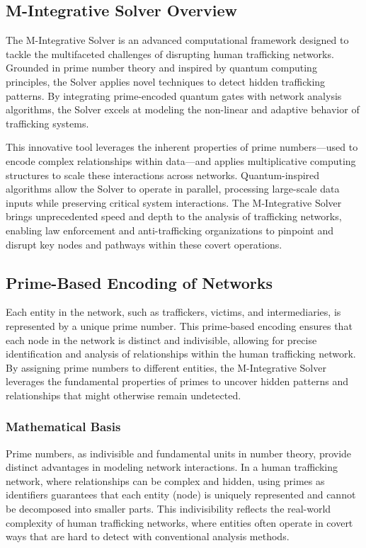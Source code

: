 \documentclass[%
 preprint, linenumbers,
 amsmath,amssymb,
 aps, physrev,
]{revtex4-2}
\begin{document}
\subsection{M-Integrative Solver Overview} The M-Integrative Solver is an advanced computational framework designed to tackle the multifaceted challenges of disrupting human trafficking networks. Grounded in prime number theory and inspired by quantum computing principles, the Solver applies novel techniques to detect hidden trafficking patterns. By integrating prime-encoded quantum gates with network analysis algorithms, the Solver excels at modeling the non-linear and adaptive behavior of trafficking systems.

This innovative tool leverages the inherent properties of prime numbers—used to encode complex relationships within data—and applies multiplicative computing structures to scale these interactions across networks. Quantum-inspired algorithms allow the Solver to operate in parallel, processing large-scale data inputs while preserving critical system interactions. The M-Integrative Solver brings unprecedented speed and depth to the analysis of trafficking networks, enabling law enforcement and anti-trafficking organizations to pinpoint and disrupt key nodes and pathways within these covert operations.

\subsection{Prime-Based Encoding of Networks}

Each entity in the network, such as traffickers, victims, and intermediaries, is represented by a unique prime number. This prime-based encoding ensures that each node in the network is distinct and indivisible, allowing for precise identification and analysis of relationships within the human trafficking network. By assigning prime numbers to different entities, the M-Integrative Solver leverages the fundamental properties of primes to uncover hidden patterns and relationships that might otherwise remain undetected.

\subsubsection{Mathematical Basis}

Prime numbers, as indivisible and fundamental units in number theory, provide distinct advantages in modeling network interactions. In a human trafficking network, where relationships can be complex and hidden, using primes as identifiers guarantees that each entity (node) is uniquely represented and cannot be decomposed into smaller parts. This indivisibility reflects the real-world complexity of human trafficking networks, where entities often operate in covert ways that are hard to detect with conventional analysis methods.
\end{document}
